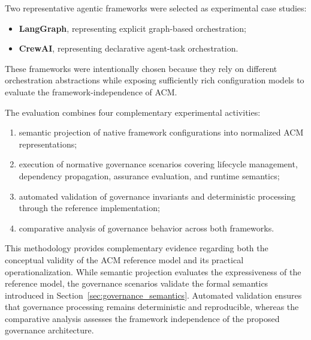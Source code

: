 \documentclass[10pt]{article}
\begin{document}
Two representative agentic frameworks were selected as experimental case studies:

\begin{itemize}
\item \textbf{LangGraph}, representing explicit graph-based orchestration;
\item \textbf{CrewAI}, representing declarative agent-task orchestration.
\end{itemize}

These frameworks were intentionally chosen because they rely on different orchestration abstractions while exposing sufficiently rich configuration models to evaluate the framework-independence of ACM.

The evaluation combines four complementary experimental activities:

\begin{enumerate}

\item semantic projection of native framework configurations into normalized ACM representations;

\item execution of normative governance scenarios covering lifecycle management, dependency propagation, assurance evaluation, and runtime semantics;

\item automated validation of governance invariants and deterministic processing through the reference implementation;

\item comparative analysis of governance behavior across both frameworks.

\end{enumerate}

This methodology provides complementary evidence regarding both the conceptual validity of the ACM reference model and its practical operationalization. While semantic projection evaluates the expressiveness of the reference model, the governance scenarios validate the formal semantics introduced in Section~\ref{sec:governance_semantics}. Automated validation ensures that governance processing remains deterministic and reproducible, whereas the comparative analysis assesses the framework independence of the proposed governance architecture.
\end{document}

